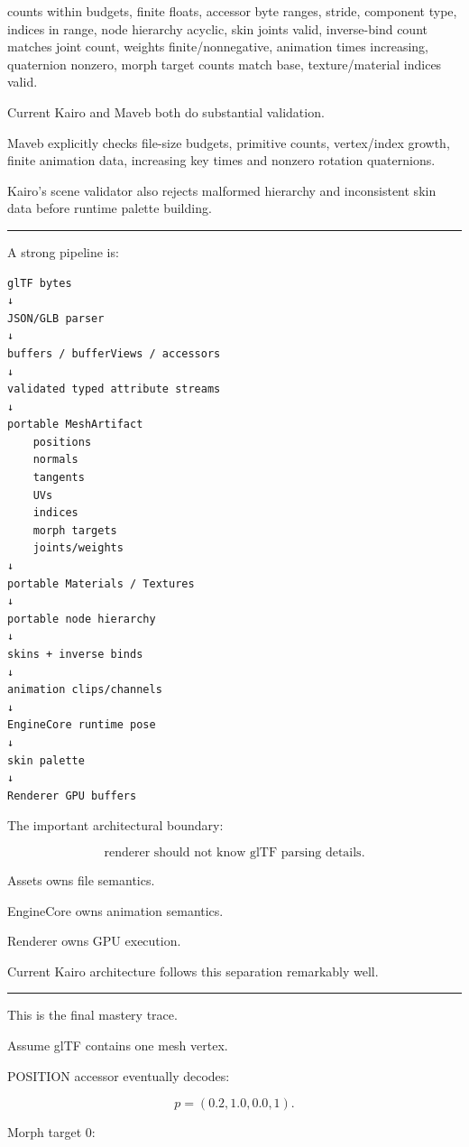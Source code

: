 counts within budgets, finite floats, accessor byte ranges, stride, component type, indices in range, node hierarchy acyclic, skin joints valid, inverse-bind count matches joint count, weights finite/nonnegative, animation times increasing, quaternion nonzero, morph target counts match base, texture/material indices valid.

Current Kairo and Maveb both do substantial validation.

Maveb explicitly checks file-size budgets, primitive counts, vertex/index growth, finite animation data, increasing key times and nonzero rotation quaternions.

Kairo's scene validator also rejects malformed hierarchy and inconsistent skin data before runtime palette building.

\begin{center}\rule{0.5\linewidth}{0.5pt}\end{center}

A strong pipeline is:

\begin{verbatim}
glTF bytes
↓
JSON/GLB parser
↓
buffers / bufferViews / accessors
↓
validated typed attribute streams
↓
portable MeshArtifact
    positions
    normals
    tangents
    UVs
    indices
    morph targets
    joints/weights
↓
portable Materials / Textures
↓
portable node hierarchy
↓
skins + inverse binds
↓
animation clips/channels
↓
EngineCore runtime pose
↓
skin palette
↓
Renderer GPU buffers
\end{verbatim}

The important architectural boundary:

\[
\boxed{
\text{renderer should not know glTF parsing details}.
}
\]

Assets owns file semantics.

EngineCore owns animation semantics.

Renderer owns GPU execution.

Current Kairo architecture follows this separation remarkably well.

\begin{center}\rule{0.5\linewidth}{0.5pt}\end{center}

This is the final mastery trace.

Assume glTF contains one mesh vertex.

POSITION accessor eventually decodes:

\[
p=
(0.2,1.0,0.0,1).
\]

Morph target 0:

